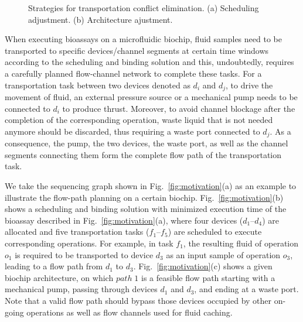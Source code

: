 \begin{figure}[t]
    \centering
    \label{ta1}
    \label{tb1}
	  \caption{Strategies for transportation conflict elimination. (a) Scheduling adjustment. (b) Architecture ajustment.}
	  \label{fig:strategy}
\end{figure}

When executing bioassays on a microfluidic biochip, fluid samples need to be transported to specific devices/channel segments at certain time windows according to the scheduling and binding solution and this, undoubtedly, requires a carefully planned flow-channel network to complete these tasks. For a  transportation task between two devices denoted as $d_i$ and $d_j$, to drive the movement of fluid, an external pressure source or a mechanical pump needs to be connected to $d_i$ to produce thrust. Moreover, to avoid channel blockage after the completion of the corresponding operation, waste liquid that is not needed anymore should be discarded, thus requiring a waste port connected to $d_j$. As a consequence, the pump, the two devices, the waste port, as well as the channel segments connecting them form the complete flow path of the transportation task.

We take the sequencing graph shown in Fig.~\ref{fig:motivation}(a) as an example to illustrate the flow-path planning on a certain biochip. Fig.~\ref{fig:motivation}(b) shows a scheduling and binding solution with minimized execution time of the bioassay described in Fig.~\ref{fig:motivation}(a), where four devices ($d_1$--$d_4$) are allocated and five transportation tasks ($f_1$--$f_5$) are scheduled to execute corresponding operations. For example, in task $f_1$, the resulting fluid of operation $o_1$ is required to be transported to device $d_3$ as an input sample of operation $o_3$, leading to a flow path from $d_1$ to $d_3$. Fig.~\ref{fig:motivation}(c) shows a given biochip architecture, on which $path\;1$ is a feasible flow path starting with a mechanical pump, passing through devices $d_1$ and $d_3$, and ending at a waste port. Note that a valid flow path should bypass those devices  occupied by other on-going operations as well as flow channels used for fluid caching.




